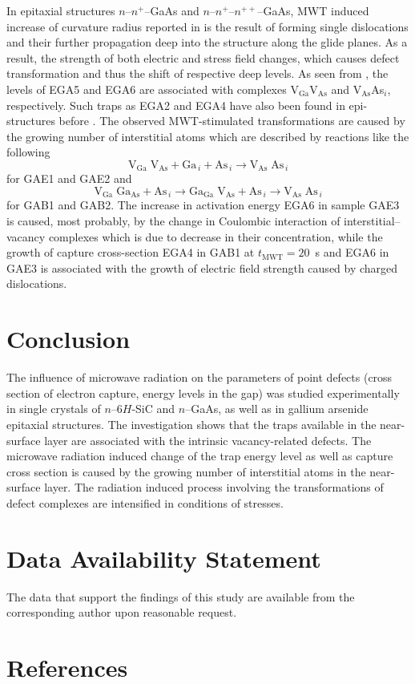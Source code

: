 \documentclass[10pt]{iopart}
\begin{document}
In epitaxial structures $n$--$n^+$--GaAs and $n$--$n^+$--$n^{++}$--GaAs,
MWT induced increase of curvature radius reported in \cite{BoltovetsEn,Konakova2012FTPEn}
is the result of forming single dislocations and their further propagation deep into the structure along the glide planes.
As a result, the strength of both electric and stress field changes,
which causes defect transformation and thus the shift of respective deep levels.
As seen from , the levels of EGA5 and EGA6 are associated with complexes   V$_\mathrm{Ga}$V$_\mathrm{As}$  and V$_\mathrm{As}$As$_i$, respectively.
Such traps as EGA2 and EGA4 have also been found in epi-structures before \cite{Yousefi1995,Mircea1975,Bourgoin:GaAs,ASHBY:GaAs,Fang:EL6,Lefevre1977,KolFTP1989En}.
The observed MWT-stimulated transformations are caused by the growing number of interstitial atoms which are described by reactions like the following
\begin{equation*}
  \mathrm{V}_\mathrm{Ga}\;\mathrm{V}_\mathrm{As}+\mathrm{Ga}_{\,i}+\mathrm{As}_{\,i} \rightarrow \mathrm{V}_\mathrm{As}\;\mathrm{As}_{\,i}
\end{equation*}
for GAE1 and GAE2 and
\begin{equation*}
  \mathrm{V}_\mathrm{Ga}\;\mathrm{Ga}_\mathrm{As}+\mathrm{As}_{\,i} \rightarrow
  \mathrm{Ga}_\mathrm{Ga}\;\mathrm{V}_\mathrm{As}+\mathrm{As}_{\,i} \rightarrow
  \mathrm{V}_\mathrm{As}\;\mathrm{As}_{\,i}
\end{equation*}
for GAB1 and GAB2.
The increase in activation energy EGA6 in sample GAE3 is caused, most probably, by the change in
Coulombic interaction of interstitial--vacancy complexes
which is due to decrease in their concentration,
while the growth of capture cross-section EGA4 in GAB1 at $t_\mathrm{MWT}=20$~s
and EGA6 in GAE3 is associated with the growth of electric field strength caused by charged dislocations.

\section{Conclusion}
The influence of microwave radiation on the parameters of point defects (cross section of electron capture, energy levels in the gap)
was studied experimentally  in single crystals of $n$–6$H$-SiC and  $n$–GaAs, as well as in gallium arsenide epitaxial structures.
The investigation shows that the traps available in the near-surface layer are associated with the intrinsic
vacancy-related defects.
The microwave radiation induced change of the trap energy level as well as capture cross section
is caused by the growing number of interstitial atoms in the near-surface layer.
The  radiation induced process involving the transformations of defect complexes are intensified in conditions of stresses.

\section*{Data Availability Statement}

The data that support the findings of this study are available from the corresponding author upon reasonable request.

\section*{References}



\end{document}
